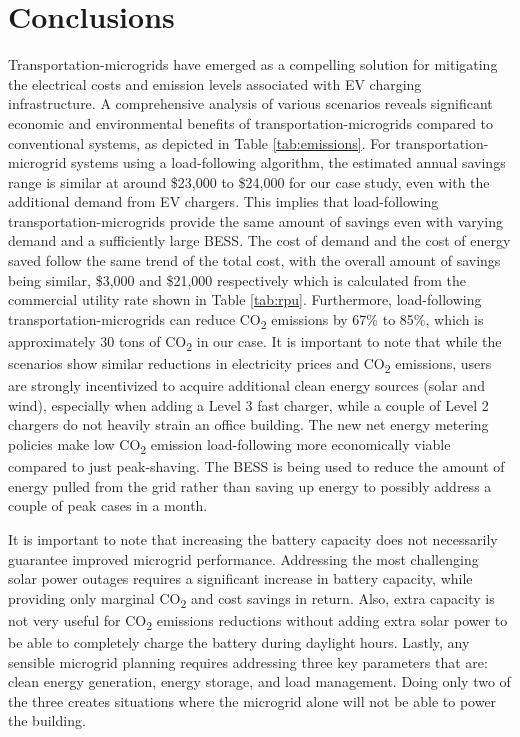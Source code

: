 \documentclass[conference]{IEEEtran}
\begin{document}
	\section{Conclusions}
	Transportation-microgrids have emerged as a compelling solution for mitigating the electrical costs and emission levels associated with EV charging infrastructure. A comprehensive analysis of various scenarios reveals significant economic and environmental benefits of transportation-microgrids compared to conventional systems, as depicted in  Table \ref{tab:emissions}. For transportation-microgrid systems using a load-following algorithm, the estimated annual savings range is similar at around \$23,000 to \$24,000 for our case study, even with the additional demand from EV chargers. This implies that load-following transportation-microgrids provide the same amount of savings even with varying demand and a sufficiently large BESS. The cost of demand and the cost of energy saved follow the same trend of the total cost, with the overall amount of savings being similar, \$3,000 and \$21,000 respectively which is calculated from the commercial utility rate shown in Table \ref{tab:rpu}. Furthermore, load-following transportation-microgrids can reduce CO\textsubscript{2} emissions by 67\% to 85\%, which is approximately 30 tons of CO\textsubscript{2} in our case. It is important to note that while the scenarios show similar reductions in electricity prices and CO\textsubscript{2} emissions, users are strongly incentivized to acquire additional clean energy sources (solar and wind), especially when adding a Level 3 fast charger, while a couple of Level 2 chargers do not heavily strain an office building. The new net energy metering policies make low CO\textsubscript{2} emission load-following more economically viable compared to just peak-shaving. The BESS is being used to reduce the amount of energy pulled from the grid rather than saving up energy to possibly address a couple of peak cases in a month.
	
	It is important to note that increasing the battery capacity does not necessarily guarantee improved microgrid performance. Addressing the most challenging solar power outages requires a significant increase in battery capacity, while providing only marginal CO\textsubscript{2} and cost savings in return. Also, extra capacity is not very useful for CO\textsubscript{2} emissions reductions without adding extra solar power to be able to completely charge the battery during daylight hours. Lastly, any sensible microgrid planning requires addressing three key parameters that are: clean energy generation, energy storage, and load management. Doing only two of the three creates situations where the microgrid alone will not be able to power the building.
	
\end{document}
